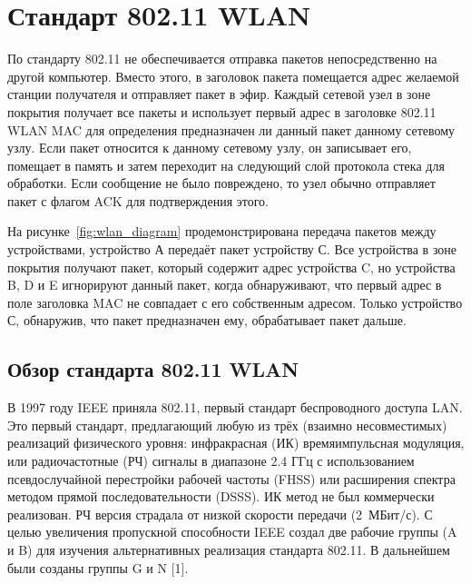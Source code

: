 \chapter{Стандарт 802.11 WLAN}

По стандарту 802.11 не обеспечивается отправка пакетов непосредственно на другой
компьютер. Вместо этого, в заголовок пакета помещается адрес желаемой станции
получателя и отправляет пакет в эфир.  Каждый сетевой узел в зоне покрытия
получает все пакеты и использует первый адрес в заголовке 802.11 WLAN MAC для
определения предназначен ли данный пакет данному сетевому узлу. Если пакет
относится к данному сетевому узлу, он записывает его, помещает в память и затем
переходит на следующий слой протокола стека для обработки.  Если сообщение не
было повреждено, то узел обычно отправляет пакет с флагом ACK для подтверждения
этого.

На рисунке~\ref{fig:wlan_diagram} продемонстрирована передача пакетов между
устройствами, устройство А передаёт пакет устройству С. Все устройства в зоне
покрытия получают пакет, который содержит адрес устройства C, но устройства B, D
и E игнорируют данный пакет, когда обнаруживают, что первый адрес в поле
заголовка MAC не совпадает с его собственным адресом. Только устройство С,
обнаружив, что пакет предназначен ему, обрабатывает пакет дальше.

\section{Обзор стандарта 802.11 WLAN}

В 1997 году IEEE приняла 802.11, первый стандарт беспроводного доступа LAN. Это
первый стандарт, предлагающий любую из трёх (взаимно несовместимых) реализаций
физического уровня: инфракрасная (ИК) времяимпульсная модуляция, или
радиочастотные (РЧ) сигналы в диапазоне 2.4 ГГц с использованием
псевдослучайной перестройки рабочей частоты (FHSS) или расширения спектра
методом прямой последовательности (DSSS). ИК метод не был коммерчески
реализован. РЧ версия страдала от низкой скорости передачи (2~МБит/с). С целью
увеличения пропускной способности IEEE создал две рабочие  группы (A и B) для
изучения альтернативных реализация стандарта 802.11. В дальнейшем были созданы
группы G и N [1].

